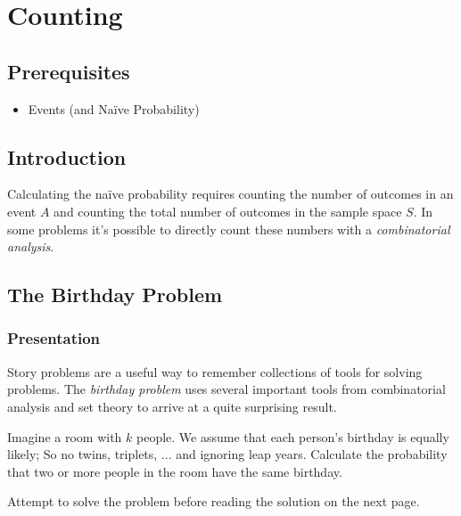 


\maketitle
\clearpage

\section{Counting}

\subsection{Prerequisites}

\begin{itemize}
\item
Events (and Naïve Probability)
\end{itemize}

\subsection{Introduction}

Calculating the naïve probability requires counting 
the number of outcomes in an event \(A\)
and counting the total number of outcomes in the sample space \(S\). 
In some problems it's possible to directly count these numbers with a \emph{combinatorial analysis}. 

\subsection{The Birthday Problem}

\subsubsection{Presentation}

Story problems are a useful way to remember collections of tools for solving problems. 
The \emph{birthday problem} uses several important tools from combinatorial
analysis and set theory to arrive at a quite surprising result.

Imagine a room with \(k\) people. 
We assume that each person's birthday is equally likely;
So no twins, triplets, ... and ignoring leap years.
Calculate the probability that two or more people in the room have the same birthday.

Attempt to solve the problem before reading the solution on the next page.

